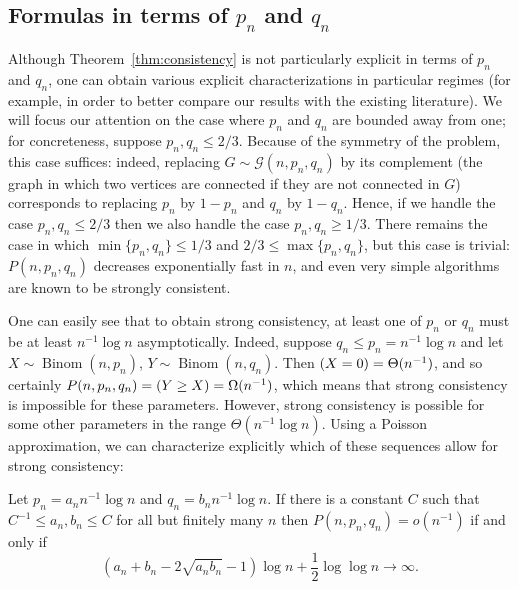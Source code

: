 \documentclass[EJP,final]{ejpecp}
\newcommand{\1}[1]{\mathbbm{1}_{\{#1\}}}
\newcommand{\calG}{\mathcal{G}}
\let\Pr\relax
\DeclareMathOperator{\Pr}{Pr}
\DeclareMathOperator{\Binom}{Binom}
\begin{document}
\subsection{Formulas in terms of $p_n$ and $q_n$}\label{sec:explicit}
Although Theorem~\ref{thm:consistency} is not particularly explicit
in terms of $p_n$ and $q_n$,
one can obtain various explicit characterizations
in particular regimes (for example, in order to better compare our results
with the existing literature).
We will focus our attention on the case where $p_n$ and $q_n$ are bounded
away from one; for concreteness, suppose $p_n, q_n \le 2/3$. Because of the
symmetry of the problem, this case suffices: 
indeed, replacing $G \sim \calG(n, p_n, q_n)$ by
its complement (the graph in which two vertices are connected if they are
not connected in $G$) corresponds to replacing $p_n$ by $1-p_n$ and $q_n$
by $1-q_n$. Hence, if we handle the case $p_n, q_n \le 2/3$ then we also
handle the case $p_n, q_n \ge 1/3$. There remains the case in which
$\min\{p_n, q_n\} \le 1/3$ and $2/3 \le \max\{p_n, q_n\}$, but this case is
trivial: $P(n, p_n, q_n)$ decreases exponentially fast in $n$, and even very
simple algorithms are known to be strongly consistent.


One can easily see that to obtain strong consistency, at least one of
$p_n$ or $q_n$ must be at least $n^{-1} \log n$ asymptotically. Indeed,
suppose $q_n \le p_n = n^{-1} \log n$ and let $X \sim \Binom(n, p_n)$, $Y \sim \Binom(n, q_n)$. Then $\Pr(X = 0) = \Theta(n^{-1})$, and so
certainly $P(n, p_n, q_n) = \Pr(Y \ge X) = \Omega(n^{-1})$,
which means that strong consistency is impossible for these parameters.
However, strong consistency is possible for some other parameters
in the range $\Theta(n^{-1} \log n)$. Using a Poisson approximation,
we can characterize explicitly which of these sequences allow for
strong consistency:
\begin{proposition}\label{prop:explicit-sparse}
    Let $p_n = a_n n^{-1} \log n$ and $q_n = b_n n^{-1} \log n$.
    If there is a constant $C$ such that $C^{-1} \le a_n, b_n \le C$ for all but
    finitely many $n$ then $P(n, p_n, q_n) = o(n^{-1})$ if and only if
\[
 (a_n + b_n - 2 \sqrt{a_n b_n} - 1) \log n + \frac 12 \log \log n \to
 \infty.
\]
\end{proposition}
\end{document}
